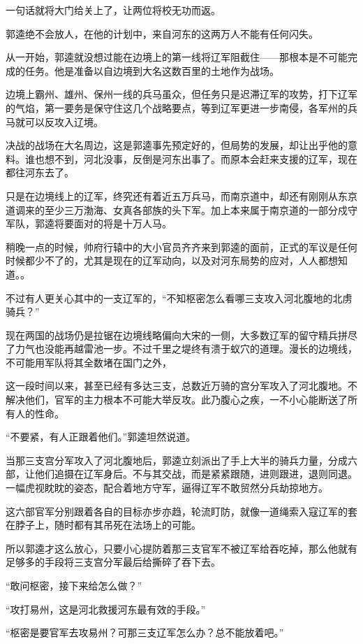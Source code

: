 一句话就将大门给关上了，让两位将校无功而返。

郭逵绝不会放人，在他的计划中，来自河东的这两万人不能有任何闪失。

从一开始，郭逵就没想过能在边境上的第一线将辽军阻截住——那根本是不可能完成的任务。他是准备以自边境到大名这数百里的土地作为战场。

边境上霸州、雄州、保州一线的兵马虽众，但任务只是迟滞辽军的攻势，打下辽军的气焰，第一要务是保守住这几个战略要点，等到辽军更进一步南侵，各军州的兵马就可以反攻入辽境。

决战的战场在大名周边，这是郭逵事先预定好的，但局势的发展，却让出乎他的意料。谁也想不到，河北没事，反倒是河东出事了。而原本会赶来支援的辽军，现在都往河东去了。

只是在边境线上的辽军，终究还有着近五万兵马，而南京道中，却还有刚刚从东京道调来的至少三万渤海、女真各部族的头下军。加上本来属于南京道的一部分戍守军队，郭逵将要面对的将是十万人马。

稍晚一点的时候，帅府行辕中的大小官员齐齐来到郭逵的面前，正式的军议是任何时候都少不了的，尤其是现在的辽军动向，以及对河东局势的应对，人人都想知道。。

不过有人更关心其中的一支辽军的，“不知枢密怎么看哪三支攻入河北腹地的北虏骑兵？”

现在两国的战场仍是拉锯在边境线略偏向大宋的一侧，大多数辽军的留守精兵拼尽了力气也没能再越雷池一步。不过千里之堤终有溃于蚁穴的道理。漫长的边境线，不可能用军队将其全数堵在国门之外，

这一段时间以来，甚至已经有多达三支，总数近万骑的宫分军攻入了河北腹地。不解决他们，官军的主力根本不可能大举反攻。此乃腹心之疾，一不小心能断送了所有人的性命。

“不要紧，有人正跟着他们。”郭逵坦然说道。

当那三支宫分军攻入了河北腹地后，郭逵立刻派出了手上大半的骑兵力量，分成六部，让他们追摄在辽军身后。不与其交战，而是紧紧跟随，进则跟进，退则同退。一幅虎视眈眈的姿态，配合着地方守军，逼得辽军不敢贸然分兵劫掠地方。

这六部官军分别跟着各自的目标亦步亦趋，轮流盯防，就像一道绳索入寇辽军的套在脖子上，随时都有其吊死在法场上的可能。

所以郭逵才这么放心，只要小心提防着那三支官军不被辽军给吞吃掉，那么他就有足够多的手段将三支宫分军最后给撕碎了吞下去。

“敢问枢密，接下来给怎么做？”

“攻打易州，这是河北救援河东最有效的手段。”

“枢密是要官军去攻易州？可那三支辽军怎么办？总不能放着吧。”

